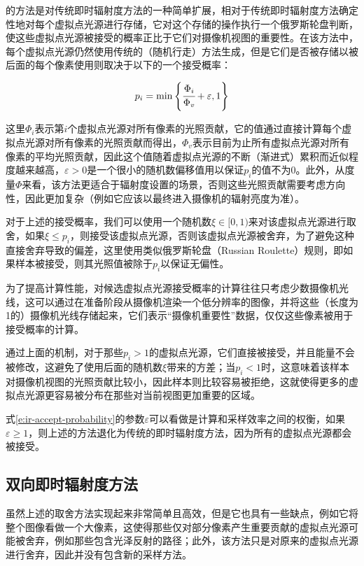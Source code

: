 \cite{a:SimpleandRobustIterativeImportanceSamplingofVirtualPointLights}的方法是对传统即时辐射度方法的一种简单扩展，相对于传统即时辐射度方法确定性地对每个虚拟点光源进行存储，它对这个存储的操作执行一个俄罗斯轮盘判断，使这些虚拟点光源被接受的概率正比于它们对摄像机视图的重要性。在该方法中，每个虚拟点光源仍然使用传统的（随机行走）方法生成，但是它们是否被存储以被后面的每个像素使用则取决于以下的一个接受概率：

\begin{equation}\label{e:ir-accept-probability}
	p_i=\min\Bigg\{ \cfrac{\Phi_i}{\Phi_v}+\varepsilon,1\Bigg\}
\end{equation}

\noindent 这里$\Phi_i$表示第$i$个虚拟点光源对所有像素的光照贡献，它的值通过直接计算每个虚拟点光源对所有像素的光照贡献而得出，$\Phi_v$表示目前为止所有虚拟点光源对所有像素的平均光照贡献，因此这个值随着虚拟点光源的不断（渐进式）累积而近似程度越来越高，$\varepsilon>0$是一个很小的随机数偏移值用以保证$p_i$的值不为0。此外，从度量$\Phi$来看，该方法更适合于辐射度设置的场景，否则这些光照贡献需要考虑方向性，因此更加复杂（例如它应该以最终进入摄像机的辐射亮度为准）。

对于上述的接受概率，我们可以使用一个随机数$\xi\in[0,1)$来对该虚拟点光源进行取舍，如果$\xi\leq p_i$，则接受该虚拟点光源，否则该虚拟点光源被舍弃，为了避免这种直接舍弃导致的偏差，这里使用类似俄罗斯轮盘（Russian Roulette）规则，即如果样本被接受，则其光照值被除于$p_i$以保证无偏性。

为了提高计算性能，对候选虚拟点光源接受概率的计算往往只考虑少数摄像机光线，这可以通过在准备阶段从摄像机渲染一个低分辨率的图像，并将这些（长度为1的）摄像机光线存储起来，它们表示“摄像机重要性”数据，仅仅这些像素被用于接受概率的计算。

通过上面的机制，对于那些$p_i >1$的虚拟点光源，它们直接被接受，并且能量不会被修改，这避免了使用后面的随机数$\xi$带来的方差；当$p_i<1$时，这意味着该样本对摄像机视图的光照贡献比较小，因此样本则比较容易被拒绝，这就使得更多的虚拟点光源更容易被分布在那些对当前视图更加重要的区域。

式\ref{e:ir-accept-probability}的参数$\varepsilon$可以看做是计算和采样效率之间的权衡，如果$\varepsilon\geq 1$，则上述的方法退化为传统的即时辐射度方法，因为所有的虚拟点光源都会被接受。




\subsection{双向即时辐射度方法}\label{sec:ir-bir}
虽然上述的取舍方法实现起来非常简单且高效，但是它也具有一些缺点，例如它将整个图像看做一个大像素，这使得那些仅对部分像素产生重要贡献的虚拟点光源可能被舍弃，例如那些包含光泽反射的路径；此外，该方法只是对原来的虚拟点光源进行舍弃，因此并没有包含新的采样方法。

